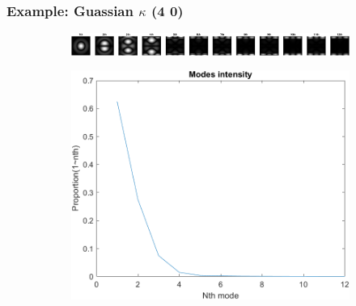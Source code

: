 \documentclass[UTF8]{beamer}
\begin{document}
\begin{frame} \frametitle{Example: Guassian $\kappa$ (4 0)}
\begin{figure}[H]
\centering
\begin{subfigure}{1\textwidth}
    \centering
    \includegraphics[width=0.9\linewidth]{../figures/ex_gu4_0.png}  
    \label{fig:modes_u}
 \end{subfigure}
 \begin{subfigure}{1\textwidth}
    \centering
    \includegraphics[width=.5\linewidth]{../figures/ex_gu4_0_s.png}  
    \label{fig:modes_u_phaze}
 \end{subfigure}
 \end{figure}
\end{frame}
\end{document}
